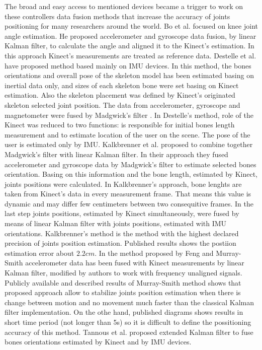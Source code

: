 \documentclass[sensors,article,submit,moreauthors,pdftex,10pt,a4paper]{mdpi}
\begin{document}
The broad and easy access to mentioned devices became a trigger to work on these controllers data fusion methods that increase the accuracy of joints positioning for many researchers around the world. Bo et al. \cite{Bo2011a} focused on knee joint angle estimation. He proposed accelerometer and gyroscope data fusion, by linear Kalman filter, to calculate the angle and aligned it to the Kinect’s estimation. In this approach Kinect's measurements are treated as reference data. Destelle et al. \cite{Destelle2014} have proposed method based mainly on IMU devices. In this method, the bones orientations and overall pose of the skeleton model has been estimated basing on inertial data only, and sizes of each skeleton bone were set basing on Kinect estimation. Also the skeleton placement was defined by Kinect's originated skeleton selected joint position. The data from accelerometer, gyroscope and magnetometer were fused by Madgwick’s filter \cite{Madgwick2011}. In Destelle's method, role of the Kinect was reduced to two functions: is responsible for initial bones length measurement and to estimate location of the user on the scene. The pose of the user is estimated only by IMU. Kalkbrenner et al. \cite{Kalkbrenner2014} proposed to combine together Madgwick’s filter with linear Kalman filter. In their approach they fused accelerometer and gyroscope data by Madgwick’s filter to estimate selected bones orientation. Basing on this information and the bone length, estimated by Kinect, joints positions were calculated. In Kalkbrenner's approach, bone lenghts are taken from Kinect's data in every measurement frame. That means this value is dynamic and may differ few centimeters between two consequitive frames. In the last step joints positions, estimated by Kinect simultaneously, were fused by means of linear Kalman filter with joints positions, estimated with IMU orientations. Kalkbrenner's method is the method with the highest declared precision of joints position estimation. Published results shows the postiion estimation error about $2.2cm$. In the method proposed by Feng and Murray-Smith \cite{Murray-Smith2014} accelerometer data has been fused with Kinect measurements by linear Kalman filter, modified by authors to work with frequency unaligned signals. Publicly available and described results of Murray-Smith method shows that proposed approach allow to stabilize joints position estimation when there is change between motion and no movement much faster than the classical Kalman filter implementation. On the othe hand, published diagrams shows results in short time period (not longer than 5s) so it is difficult to define the possitioning accuracy of this method. Tannous et al. \cite{Tannous2016} proposed extended Kalman filter to fuse bones orientations estimated by Kinect and by IMU devices. 
\end{document}
